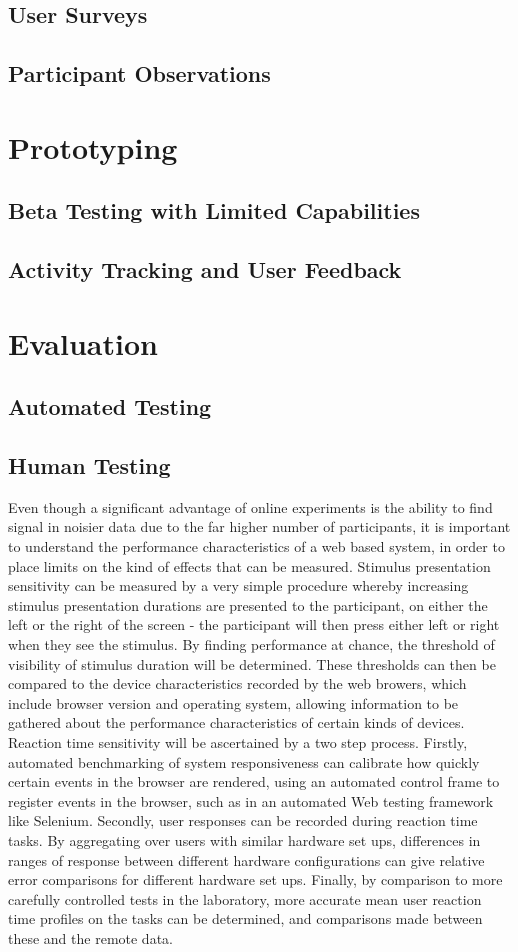 \documentclass[12pt,a4paper,titlepage]{scrreprt}
\begin{document}
\subsection{User Surveys}
\subsection{Participant Observations}
\section{Prototyping}
\subsection{Beta Testing with Limited Capabilities}
\subsection{Activity Tracking and User Feedback}
\section{Evaluation}
\subsection{Automated Testing}
\subsection{Human Testing}
Even though a significant advantage of online experiments is the ability to find signal in noisier data due to the far higher number of participants\cite{birnbaum_web-based_2001}, it is important to understand the performance characteristics of a web based system, in order to place limits on the kind of effects that can be measured. 
Stimulus presentation sensitivity can be measured by a very simple procedure whereby increasing stimulus presentation durations are presented to the participant, on either the left or the right of the screen - the participant will then press either left or right when they see the stimulus. By finding performance at chance, the threshold of visibility of stimulus duration will be determined. These thresholds can then be compared to the device characteristics recorded by the web browers, which include browser version and operating system, allowing information to be gathered about the performance characteristics of certain kinds of devices.
Reaction time sensitivity will be ascertained by a two step process. Firstly, automated benchmarking of system responsiveness can calibrate how quickly certain events in the browser are rendered, using an automated control frame to register events in the browser, such as in an automated Web testing framework like Selenium\cite{_selenium_????}. Secondly, user responses can be recorded during reaction time tasks. By aggregating over users with similar hardware set ups, differences in ranges of response between different hardware configurations can give relative error comparisons for different hardware set ups. Finally, by comparison to more carefully controlled tests in the laboratory, more accurate mean user reaction time profiles on the tasks can be determined, and comparisons made between these and the remote data.
\end{document}
